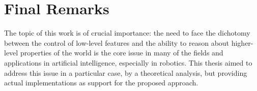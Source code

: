 \section{Final Remarks}
The topic of this work is of crucial importance: the need to face the dichotomy between the control of low-level features and the ability to reason about higher-level properties of the world is the core issue in many of the fields and applications in artificial intelligence, especially in robotics. This thesis aimed to address this issue in a particular case, by a theoretical analysis, but providing actual implementations as support for the proposed approach.